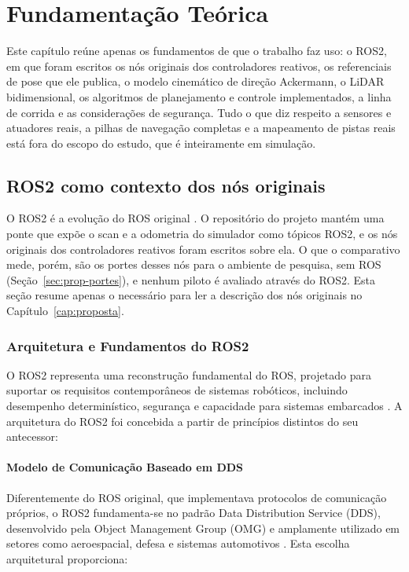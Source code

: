 \chapter{Fundamentação Teórica}\label{cap:ferramentas}

Este capítulo reúne apenas os fundamentos de que o trabalho faz uso: o ROS2, em
que foram escritos os nós originais dos controladores reativos, os referenciais de pose que ele publica, o
modelo cinemático de direção Ackermann, o LiDAR bidimensional, os algoritmos de
planejamento e controle implementados, a linha de corrida e as considerações de
segurança. Tudo o que diz respeito a sensores e atuadores reais, a pilhas de
navegação completas e a mapeamento de pistas reais está fora do escopo do
estudo, que é inteiramente em simulação.

\section{ROS2 como contexto dos nós originais}

O ROS2 é a evolução do ROS original \cite{quigley2009ros}. O repositório do
projeto mantém uma ponte que expõe o scan e a odometria do simulador como tópicos
ROS2, e os nós originais dos controladores reativos foram escritos sobre ela. O
que o comparativo mede, porém, são os portes desses nós para o ambiente de
pesquisa, sem ROS (Seção~\ref{sec:prop-portes}), e nenhum piloto é avaliado
através do ROS2. Esta seção resume apenas o necessário para ler a descrição dos
nós originais no Capítulo~\ref{cap:proposta}.

\subsection{Arquitetura e Fundamentos do ROS2}

O ROS2 representa uma reconstrução fundamental do ROS, projetado para suportar
os requisitos contemporâneos de sistemas robóticos, incluindo desempenho
determinístico, segurança e capacidade para sistemas embarcados
\cite{macenski2022robot}. A arquitetura do ROS2 foi concebida a partir de
princípios distintos do seu antecessor:

\subsubsection{Modelo de Comunicação Baseado em DDS}

Diferentemente do ROS original, que implementava protocolos de comunicação
próprios, o ROS2 fundamenta-se no padrão Data Distribution Service (DDS),
desenvolvido pela Object Management Group (OMG) e amplamente utilizado em
setores como aeroespacial, defesa e sistemas automotivos
\cite{maruyama2016exploring}. Esta escolha arquitetural proporciona:

